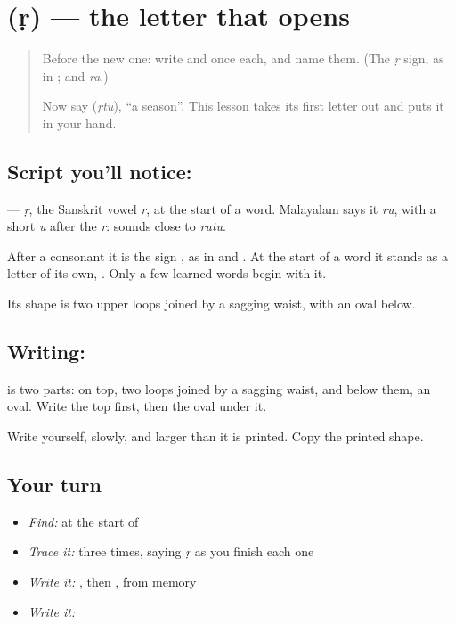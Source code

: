 \section[\texorpdfstring{\ml{ഋ} (ṛ)}{ഋ (ṛ)}]{ (ṛ) — the letter that opens }

\label{lesson:ML-W346-vocalic-r}



\begin{quote}
Before the new one: write \textbf{} and \textbf{} once each, and name them. (The \emph{ṛ} sign, as in \textbf{}; and \emph{ra}.)

Now say \textbf{} (\emph{ṛtu}), \textquotedblleft{}a season\textquotedblright{}. This lesson takes its first letter out and puts it in your hand.
\end{quote}

\subsection*{Script you'll notice: }
\textbf{} — \emph{ṛ}, the Sanskrit vowel \emph{r}, at the start of a word. Malayalam says it \emph{ru}, with a short \emph{u} after the \emph{r}: \textbf{} sounds close to \emph{rutu}.

After a consonant it is the sign \textbf{}, as in \textbf{} and \textbf{}. At the start of a word it stands as a letter of its own, \textbf{}. Only a few learned words begin with it.

Its shape is two upper loops joined by a sagging waist, with an oval below.

\subsection*{Writing: }
\textbf{} is two parts: on top, two loops joined by a sagging waist, and below them, an oval. Write the top first, then the oval under it.

Write \textbf{} yourself, slowly, and larger than it is printed. Copy the printed shape.

\subsection*{Your turn}
\begin{itemize}
\raggedright
  \item \emph{Find:}  at the start of \textbf{}
  \item \emph{Trace it:}  three times, saying \emph{ṛ} as you finish each one
  \item \emph{Write it:} , then , from memory
  \item \emph{Write it:} \textbf{}
\end{itemize}

